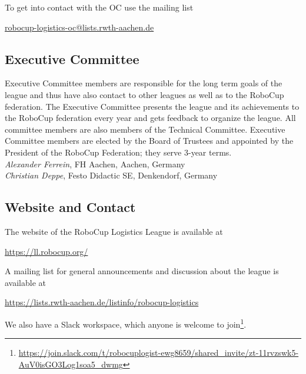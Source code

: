 \documentclass[12pt,twoside]{article}
\begin{document}
\medskip
\noindent To get into contact with the \ac{OC} use the mailing list\\
\centerline{\url{robocup-logistics-oc@lists.rwth-aachen.de}}

\subsection{Executive Committee}
\label{sec:ec}
Executive Committee members are responsible for the long term goals of
the league and thus have also contact to other leagues as well as to
the RoboCup federation. The Executive Committee presents the league
and its achievements to the RoboCup federation every year and gets
feedback to organize the league. All committee members are also
members of the Technical Committee. Executive Committee members are
elected by the Board of Trustees and appointed by the President of the
RoboCup Federation; they serve 3-year terms.\\[.5em]
\emph{Alexander Ferrein}, FH Aachen, Aachen, Germany\\
\emph{Christian Deppe}, Festo Didactic SE, Denkendorf, Germany

\subsection{Website and Contact}
\label{sec:website-ml}
The website of the RoboCup Logistics League is available at\\
\centerline{\url{https://ll.robocup.org/}}

\smallskip
\noindent
A mailing list for general announcements and discussion about the
league is available at\\
\centerline{\url{https://lists.rwth-aachen.de/listinfo/robocup-logistics}}

\smallskip
\noindent
We also have a Slack workspace, which anyone is welcome to
join\footnote{{\url{https://join.slack.com/t/robocuplogist-ewg8659/shared_invite/zt-11rvzswk5-AuV0isGO3Log1soa5_dwmg}}}. %

\end{document}
